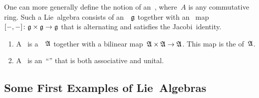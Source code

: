 \begin{remark}
	One can more generally define the notion of an~, where~$A$ is any commutative ring.
	Such a Lie~algebra consists of an~~$\mathfrak{g}$ together with an~ map~$[\ph, \ph] \colon \glie \times \glie \to \glie$ that is alternating and satisfies the Jacobi~identity.
\end{remark}


\begin{definition}
	\label{definitions of an algebra}
	\leavevmode
	\begin{enumerate}
		\item
			A~ is a~\vectorspace{$\kf$}~$\mathfrak{A}$ together with a bilinear map~$\Aalg \times \Aalg \to \Aalg$.
			This map is the  of~$\mathfrak{A}$.
		\item
			A~ is an~\enquote{\algebra{$\kf$}} that is both associative and unital.
	\end{enumerate}
\end{definition}


\subsection{Some First Examples of Lie~Algebras}


